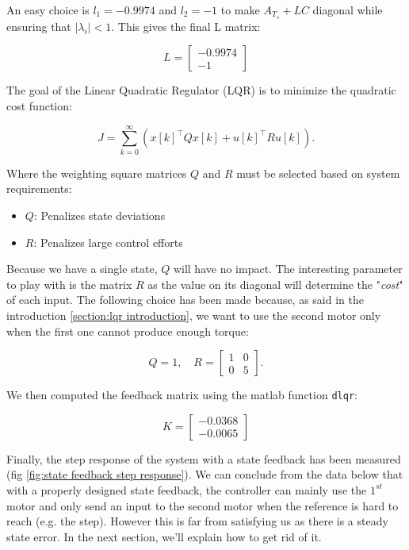 An easy choice is $l_1 = -0.9974$ and $l_2 = -1$ to make $A_{T_s} + LC$ diagonal while ensuring that $\left|\lambda_i
\right| < 1$. This gives the final L matrix:

\begin{equation}
    L = \begin{bmatrix}
        -0.9974 \\ -1
    \end{bmatrix}
\end{equation}
\fi

The goal of the Linear Quadratic Regulator (LQR) is to minimize the quadratic cost function:

\[
J = \sum_{k=0}^\infty \left( x[k]^\top Q x[k] + u[k]^\top R u[k] \right).
\]

Where the weighting square matrices \( Q \) and \( R \) must be selected based on system requirements:

\begin{itemize}
    \item \( Q \): Penalizes state deviations
    \item \( R \): Penalizes large control efforts
\end{itemize}

Because we have a single state, $Q$ will have no impact. The interesting parameter to play with is the matrix $R$ as the
value on its diagonal will determine the "\textit{cost}" of each input. The following choice has been made because, as 
said in the introduction \ref{section:lqr introduction}, we want to use the second motor only when the first one cannot 
produce enough torque:

\[
Q = 1, \quad
R = \begin{bmatrix}
1 & 0 \\
0 & 5
\end{bmatrix}.
\]

We then computed the feedback matrix using the matlab function \texttt{dlqr}:

\[
K = \begin{bmatrix}
    -0.0368\\
    -0.0065
\end{bmatrix}
\]

Finally, the step response of the system with a state feedback has been measured (fig \ref{fig:state feedback step 
response}). We can conclude from the data below that with a properly designed state feedback, the controller can mainly
use the $1^{st}$ motor and only send an input to the second motor when the reference is hard to reach (e.g. the step).
However this is far from satisfying us as there is  a steady state error. In the next section, we'll explain how to get 
rid of it.

